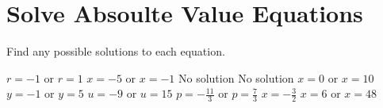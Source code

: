 \section*{Solve Absoulte Value Equations}
Find any possible solutions to each equation.
\begin{smenum}
\mitemxxxx
{$r=-1$ or $r=1$}
{$x=-5$ or $x=-1$}
{No solution}
{No solution}
\mitemxxxx
{$x=0$ or $x=10$}
{$y=-1$ or $y=5$}
{$u=-9$ or $u=15$}
{$p=-\frac{11}{3}$ or $p=\frac{7}{3}$}
\mitemxx
{$x=-\frac{3}{2}$}
{$x=6$ or $x=48$}
\end{smenum}


